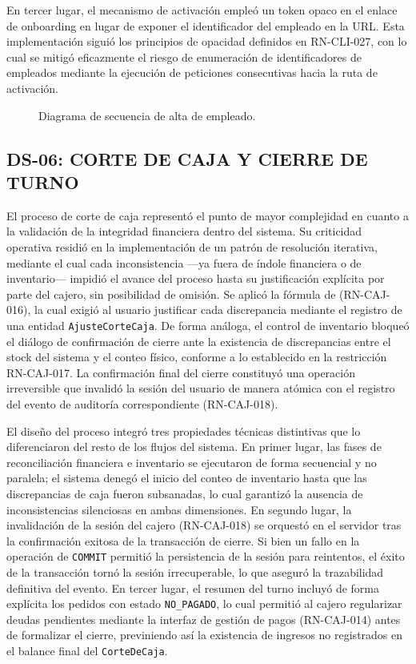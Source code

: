 En tercer lugar, el mecanismo de activación empleó un token opaco en el enlace de onboarding en lugar de exponer el identificador del empleado en la URL. Esta implementación siguió los principios de opacidad definidos en RN-CLI-027, con lo cual se mitigó eficazmente el riesgo de enumeración de identificadores de empleados mediante la ejecución de peticiones consecutivas hacia la ruta de activación. 
\begin{landscape}
\begin{figure}[H]
    \centering
    
    \caption{Diagrama de secuencia de alta de empleado.}
    \label{fig:diagrama-secuencia-alta-empleado}
\end{figure}
\end{landscape}
\subsection{DS-06: CORTE DE CAJA Y CIERRE DE TURNO}
El proceso de corte de caja representó el punto de mayor complejidad en cuanto a la validación de la integridad financiera dentro del sistema. Su criticidad operativa residió en la implementación de un patrón de resolución iterativa, mediante el cual cada inconsistencia ---ya fuera de índole financiera o de inventario--- impidió el avance del proceso hasta su justificación explícita por parte del cajero, sin posibilidad de omisión. Se aplicó la fórmula de (RN-CAJ-016), la cual exigió al usuario justificar cada discrepancia mediante el registro de una entidad \texttt{AjusteCorteCaja}. De forma análoga, el control de inventario bloqueó el diálogo de confirmación de cierre ante la existencia de discrepancias entre el stock del sistema y el conteo físico, conforme a lo establecido en la restricción RN-CAJ-017. La confirmación final del cierre constituyó una operación irreversible que invalidó la sesión del usuario de manera atómica con el registro del evento de auditoría correspondiente (RN-CAJ-018). 

El diseño del proceso integró tres propiedades técnicas distintivas que lo diferenciaron del resto de los flujos del sistema. En primer lugar, las fases de reconciliación financiera e inventario se ejecutaron de forma secuencial y no paralela; el sistema denegó el inicio del conteo de inventario hasta que las discrepancias de caja fueron subsanadas, lo cual garantizó la ausencia de inconsistencias silenciosas en ambas dimensiones. En segundo lugar, la invalidación de la sesión del cajero (RN-CAJ-018) se orquestó en el servidor tras la confirmación exitosa de la transacción de cierre. Si bien un fallo en la operación de \texttt{COMMIT} permitió la persistencia de la sesión para reintentos, el éxito de la transacción tornó la sesión irrecuperable, lo que aseguró la trazabilidad definitiva del evento. En tercer lugar, el resumen del turno incluyó de forma explícita los pedidos con estado \texttt{NO\_PAGADO}, lo cual permitió al cajero regularizar deudas pendientes mediante la interfaz de gestión de pagos (RN-CAJ-014) antes de formalizar el cierre, previniendo así la existencia de ingresos no registrados en el balance final del \texttt{CorteDeCaja}. 

